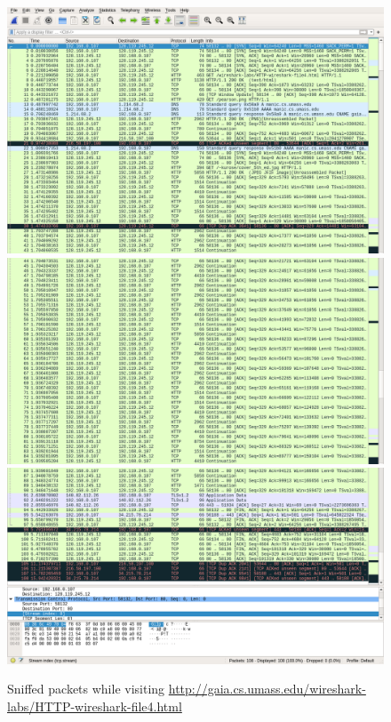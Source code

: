 \documentclass{homework}
\begin{document}
\begin{enumerate}[label={(\arabic*)}]
  \begin{figure}[H]
    \centering
    \includegraphics[width=\textwidth]{file4-image-0}
    \includegraphics[width=\textwidth]{file4-image-1}
    \includegraphics[width=\textwidth]{file4-image-2}
    \caption{Sniffed packets while visiting \url{http://gaia.cs.umass.edu/wireshark-labs/HTTP-wireshark-file4.html}}
  \end{figure}


\end{enumerate}
\end{document}
